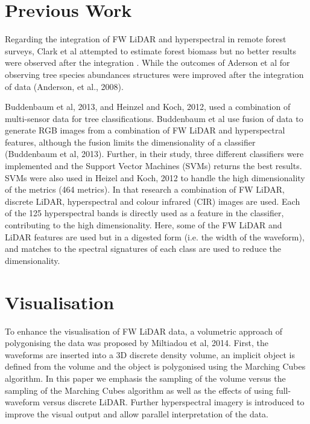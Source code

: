 \documentclass{subfiles}
\begin{document}
	\section{Previous Work}
	
	\par Regarding the integration of FW LiDAR and hyperspectral in remote forest surveys, Clark et al attempted to estimate forest biomass but no better results were observed after the integration \cite{Clark2011}. While the outcomes of Aderson et al for observing tree species abundances structures were improved after the integration of data (Anderson, et al., 2008).
	
	\par \cite{Buddenbaum2013} Buddenbaum et al, 2013, and Heinzel and Koch, 2012, used a combination of multi-sensor data for tree classifications. Buddenbaum et al use fusion of data to generate RGB images from a combination of FW LiDAR and hyperspectral features, although the fusion limits the dimensionality of a classifier 	(Buddenbaum et al, 2013). Further, in their study, three different classifiers were implemented and the Support Vector Machines (SVMs) returns the best results. SVMs were also used in Heizel and Koch, 2012 to handle the high dimensionality of the metrics (464 metrics). In that research a combination of FW LiDAR, discrete LiDAR, hyperspectral and colour infrared (CIR) images are used. Each of the 125 hyperspectral bands is directly used as a feature in the classifier, contributing to the high dimensionality. Here, some of the FW 	LiDAR and LiDAR features are used but in a digested form (i.e. the width of the waveform), and matches to the spectral signatures of each class are used to reduce the dimensionality.
	
	\section{Visualisation}
	\par To enhance the visualisation of FW LiDAR data, a volumetric approach of polygonising the data was proposed by Miltiadou et al, 2014. First, the waveforms are inserted into a 3D discrete density volume, an implicit object is defined from the volume and the object is polygonised using the Marching Cubes algorithm. In this paper we emphasis the sampling of the volume versus the sampling of the Marching Cubes algorithm as well as the effects of using full-waveform versus discrete LiDAR. Further hyperspectral imagery is introduced to improve the visual output and allow parallel interpretation of the data.
	
\end{document}

